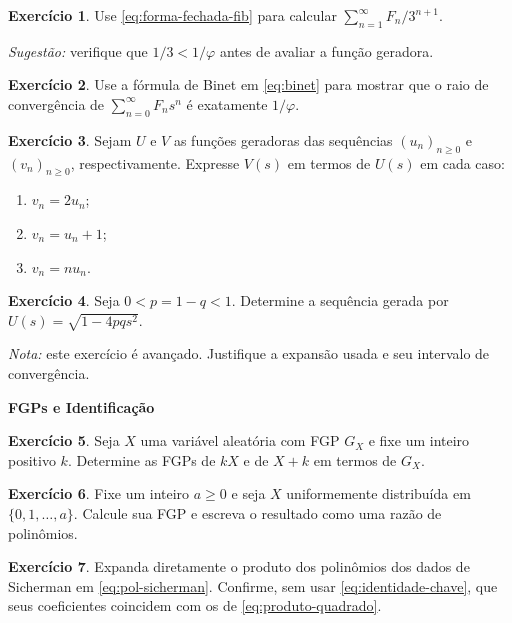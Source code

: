 \documentclass[12pt,portuguese]{article}
\theoremstyle{definition}
\theoremstyle{plainexercise}
\newtheorem{exercise}{Exercício}
\theoremstyle{starredexercise}
\theoremstyle{definition}
\begin{document}
\begin{exercise}\label{ex:soma-fib-3}
Use \eqref{eq:forma-fechada-fib} para calcular
$\sum_{n=1}^{\infty}F_n/3^{n+1}$.

\emph{Sugestão:} verifique que $1/3<1/\varphi$ antes de avaliar a função
geradora.
\end{exercise}

\begin{exercise}\label{ex:raio-convergencia}
Use a fórmula de Binet em \eqref{eq:binet} para mostrar que o raio de
convergência de $\sum_{n=0}^{\infty}F_ns^n$ é exatamente $1/\varphi$.
\end{exercise}

\begin{exercise}\label{exercise:gw-4-4}
Sejam $U$ e $V$ as funções geradoras das sequências $(u_n)_{n\geqslant0}$ e
$(v_n)_{n\geqslant0}$, respectivamente. Expresse $V(s)$ em termos de $U(s)$
em cada caso:
\begin{enumerate}[label=(\alph*)]
\item $v_n=2u_n$;
\item $v_n=u_n+1$;
\item $v_n=nu_n$.
\end{enumerate}
\end{exercise}

\begin{exercise}\label{exercise:gw-4-5}
Seja $0<p=1-q<1$. Determine a sequência gerada por
$U(s)=\sqrt{1-4pqs^2}$.

\emph{Nota:} este exercício é avançado. Justifique a expansão usada e seu
intervalo de convergência.
\end{exercise}

\medskip
\noindent\textbf{FGPs e Identificação}

\begin{exercise}\label{exercise:gw-4-18}
Seja $X$ uma variável aleatória com FGP $G_X$ e fixe um inteiro positivo $k$.
Determine as FGPs de $kX$ e de $X+k$ em termos de $G_X$.
\end{exercise}

\begin{exercise}\label{exercise:gw-4-19}
Fixe um inteiro $a\geqslant0$ e seja $X$ uniformemente distribuída em
$\{0,1,\ldots,a\}$. Calcule sua FGP e escreva o resultado como uma razão de
polinômios.
\end{exercise}

\begin{exercise}\label{ex:sicherman-verificacao}
Expanda diretamente o produto dos polinômios dos dados de Sicherman em
\eqref{eq:pol-sicherman}. Confirme, sem usar \eqref{eq:identidade-chave}, que
seus coeficientes coincidem com os de \eqref{eq:produto-quadrado}.
\end{exercise}
\end{document}
